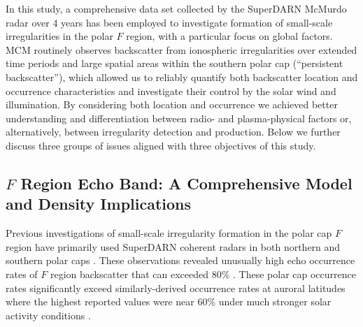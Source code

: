 In this study, a comprehensive data set collected by the SuperDARN McMurdo radar over 4 years has been employed to investigate formation of small-scale irregularities in the polar \(F\) region, with a particular focus on global factors. MCM routinely observes backscatter from ionospheric irregularities over extended time periods and large spatial areas within the southern polar cap (``persistent backscatter''), which allowed us to reliably quantify both backscatter location and occurrence characteristics and investigate their control by the solar wind and illumination. By considering both location and occurrence we achieved better understanding and differentiation between radio- and plasma-physical factors or, alternatively, between irregularity detection and production. Below we further discuss three groups of issues aligned with three objectives of this study.

\subsection{\(F\) Region Echo Band: A Comprehensive Model and Density Implications}

Previous investigations of small-scale irregularity formation in the polar cap \(F\) region have primarily used SuperDARN coherent radars in both northern and southern polar caps \citep{Bristow2011,Ghezelbash2014b,Koustov2014}. These observations revealed unusually high echo occurrence rates of \(F\) region backscatter that can exceeded 80\% \citep{Bristow2011,Ghezelbash2014b}. These polar cap occurrence rates significantly exceed similarly-derived occurrence rates at auroral latitudes where the highest reported values were near 60\% under much stronger solar activity conditions \citep[e.g.][]{Koustov2004}.

